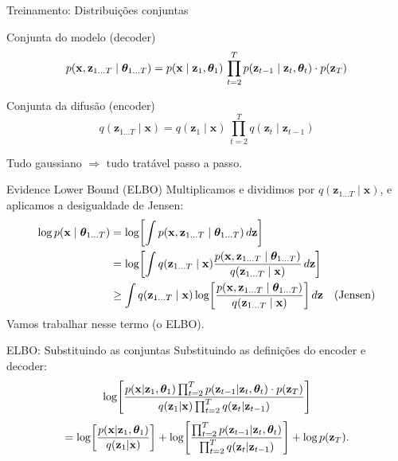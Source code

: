 \documentclass[aspectratio=169,xcolor=dvipsnames]{beamer}
\begin{document}
  \begin{frame}{Treinamento: Distribuições conjuntas}
    \begin{block}{Conjunta do modelo (decoder)}
      \[
        p(\mathbf{x}, \mathbf{z}_{1\ldots T} \mid \bm{\theta}_{1\ldots T})
        = p(\mathbf{x} \mid \mathbf{z}_1,\bm{\theta}_1)\, \prod_{t=2}^{T} p(\mathbf{z}_{t-1} \mid \mathbf{z}_t,\bm{\theta}_t)\cdot p(\mathbf{z}_T)
      \]
    \end{block}
    \begin{block}{Conjunta da difusão (encoder)}
      \[
        q(\mathbf{z}_{1\ldots T} \mid \mathbf{x}) = q(\mathbf{z}_1 \mid \mathbf{x})\, \prod_{t=2}^{T} q(\mathbf{z}_t \mid \mathbf{z}_{t-1})
      \]
    \end{block}
    \vspace{0.2em}
    Tudo gaussiano $\Rightarrow$ tudo tratável passo a passo.
  \end{frame}

  \begin{frame}{Evidence Lower Bound (ELBO)}
    Multiplicamos e dividimos por $q(\mathbf{z}_{1\ldots T}\mid \mathbf{x})$, e aplicamos
    a desigualdade de Jensen:
    \vspace{0.2em}
    \begin{align*}
      \log p(\mathbf{x} \mid \bm{\theta}_{1\ldots T})
      &= \log\!\left[\int p(\mathbf{x}, \mathbf{z}_{1\ldots T} \mid \bm{\theta}_{1\ldots T})\, d\mathbf{z}\right] \\
      &= \log\!\left[\int q(\mathbf{z}_{1\ldots T} \mid \mathbf{x})\frac{p(\mathbf{x}, \mathbf{z}_{1\ldots T} \mid \bm{\theta}_{1\ldots T})}{q(\mathbf{z}_{1\ldots T} \mid \mathbf{x})}\, d\mathbf{z}\right] \\
      &\geq \int q(\mathbf{z}_{1\ldots T} \mid \mathbf{x}) \log\!\left[\frac{p(\mathbf{x}, \mathbf{z}_{1\ldots T} \mid \bm{\theta}_{1\ldots T})}{q(\mathbf{z}_{1\ldots T} \mid \mathbf{x})}\right] d\mathbf{z}
      \quad \text{(Jensen)}
    \end{align*}
    \vspace{0.1em}
    Vamos trabalhar nesse termo (o ELBO).
  \end{frame}

  \begin{frame}{ELBO: Substituindo as conjuntas}
    Substituindo as definições do encoder e decoder:
    \vspace{0.2em}
    \[
      \log\!\left[\frac{p(\mathbf{x}|\mathbf{z}_1,\bm{\theta}_1) \prod_{t=2}^{T} p(\mathbf{z}_{t-1}|\mathbf{z}_t,\bm{\theta}_t)\cdot p(\mathbf{z}_T)}{q(\mathbf{z}_1|\mathbf{x})\prod_{t=2}^{T} q(\mathbf{z}_t|\mathbf{z}_{t-1})}\right]
    \]
    \vspace{0.1em}
    \[
      = \log\!\left[\frac{p(\mathbf{x}|\mathbf{z}_1,\bm{\theta}_1)}{q(\mathbf{z}_1|\mathbf{x})}\right]
      + \log\!\left[\frac{\prod_{t=2}^{T} p(\mathbf{z}_{t-1}|\mathbf{z}_t,\bm{\theta}_t)}{\prod_{t=2}^{T} q(\mathbf{z}_t|\mathbf{z}_{t-1})}\right]
      + \log p(\mathbf{z}_T).
    \]
  \end{frame}
\end{document}
